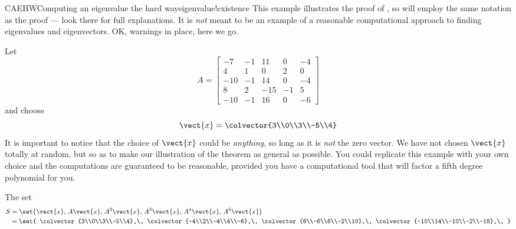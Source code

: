 \begin{example}{CAEHW}{Computing an eigenvalue the hard way}{eigenvalue!existence}
%
This example illustrates the proof of , so will employ the same notation as the proof --- look there for full explanations.  It is {\em not} meant to be an example of a reasonable computational approach to finding eigenvalues and eigenvectors.  OK, warnings in place, here we go.\par
%
Let
%
\begin{equation*}
A=\begin{bmatrix}
-7 & -1 & 11 & 0 & -4\\
4 & 1 & 0 & 2 & 0\\
-10 & -1 & 14 & 0 & -4\\
8 & 2 & -15 & -1 & 5\\
-10 & -1 & 16 & 0 & -6
\end{bmatrix}
\end{equation*}
%
and choose
%
\begin{equation*}
\vect{x}=\colvector{3\\0\\3\\-5\\4}
\end{equation*}
%
It is important to notice that the choice of $\vect{x}$ could be {\em anything}, so long as it is {\em not} the zero vector.  We have not chosen $\vect{x}$ totally at random, but so as to make our illustration of the theorem as general as possible.  You could replicate this example with your own choice and the computations are guaranteed to be reasonable, provided you have a computational tool that will factor a fifth degree polynomial for you.\par
%
The set
%
\begin{align*}
S&=\set{\vect{x},\,A\vect{x},\,A^2\vect{x},\,A^3\vect{x},\,A^4\vect{x},\,A^5\vect{x}}\\
&=
\set{
\colvector{3\\0\\3\\-5\\4},\,
\colvector{-4\\2\\-4\\4\\-6},\,
\colvector{6\\-6\\6\\-2\\10},\,
\colvector{-10\\14\\-10\\-2\\-18},\,
}
\end{align*}
\end{example}
